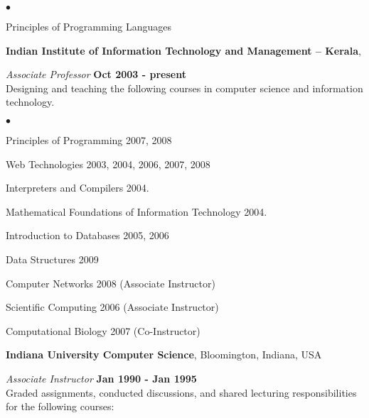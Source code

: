 \documentclass[11pt,margin,line]{res}
\newenvironment{list2}{
  \begin{list}{$\bullet$}{%
      \setlength{\itemsep}{0in}
      \setlength{\parsep}{0in} \setlength{\parskip}{0in}
      \setlength{\topsep}{0in} \setlength{\partopsep}{0in} 
      \setlength{\leftmargin}{0.2in}}}{\end{list}}
\begin{document}
\begin{resume}
\begin{list2}
\item Principles of Programming  Languages
\end{list2}

\vspace*{1em}

{\bf Indian Institute of Information Technology and Management -- Kerala},

\vspace{-.5cm}

{\em Associate Professor} \hfill {\bf Oct 2003 - present}\\
Designing and teaching the following courses in computer
science and information technology.

\vspace*{1em}

\begin{list2}
\item Principles of Programming  2007, 2008
\item Web Technologies  2003, 2004, 2006, 2007, 2008
\item Interpreters and Compilers 2004.
\item Mathematical Foundations of Information Technology 2004.
\item Introduction to Databases 2005, 2006
\item Data Structures 2009
\item Computer Networks  2008 (Associate Instructor)
\item Scientific Computing 2006 (Associate Instructor)
\item Computational Biology 2007 (Co-Instructor)
\end{list2}


{\bf Indiana University Computer Science},
Bloomington, Indiana, USA

\vspace{-.5cm}

{\em Associate Instructor} \hfill {\bf Jan 1990 - Jan 1995}\\
Graded assignments, conducted discussions, and
shared lecturing responsibilities for the following courses:



\end{resume}
\end{document}
